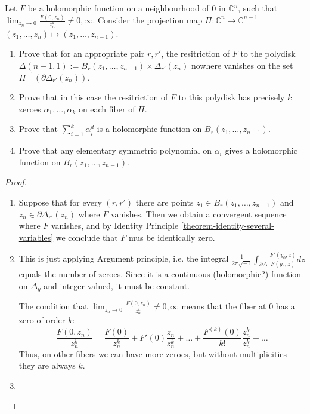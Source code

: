 \begin{exercise}
\label{exercise-polydisks}
Let $F$ be a holomorphic function on a
neighbourhood of $0$ in $\mathbb{C}^n$,
such that $\lim_{z_n\to 0}
\frac{F(0,z_n)}{z_n^k}\neq 0,\infty$.
Consider the projection map
$\Pi:\mathbb{C}^n\to\mathbb{C}^{n-1}$
$(z_1,\ldots,z_n)\mapsto
(z_1,\ldots,z_{n-1})$.
\begin{enumerate}
\item Prove that for an appropriate pair
$r,r'$, the resitriction of $F$ to the
polydisk
$\Delta(n-1,1):=B_r(z_1,\ldots,z_{n-1})
\times\Delta_{r'}(z_n)$
nowhere
vanishes on the set
$\Pi^{-1}(\partial\Delta_{r'}(z_n))$.
\item Prove that in this case the
resitriction of $F$ to this polydisk has
precisely $k$ zeroes
$\alpha_1,\ldots,\alpha_k$ on each fiber of
$\Pi$.
\item Prove that $\sum_{i=1}^k \alpha_i^d$ is
a holomorphic function on
$B_r(z_1,\ldots,z_{n-1})$.
\item Prove that any elementary symmetric
polynomial on $\alpha_i$ gives a
holomorphic function on
$B_r(z_1,\ldots,z_{n-1})$.
\end{enumerate}
\end{exercise}

\begin{proof}
\begin{enumerate}
\item Suppose that for every $(r,r')$ there
are points
$z_1\in B_r(z_1,\ldots,z_{n-1})$ and $z_n\in
\partial\Delta_{r'}(z_n)$
where $F$ vanishes. Then we obtain a
convergent sequence where $F$
vanishes, and by Identity Principle
\ref{theorem-identity-several-variables} we
conclude that $F$ mus be identically zero.
\item This is just applying Argument
principle, i.e. the integral
$\frac{1}{2\pi\sqrt{-1}}\int_{\partial
\Delta}\frac{F'(y_0,z)}{F(y_0,z)}dz$
equals the number of zeroes. Since it is a
continuous (holomorphic?) function on
$\Delta_y$ and integer valued, it must be
constant.

The condition that
$\lim_{z_n\to0}\frac{F(0,z_n)}{z_n^k}\neq
0,\infty$ means
that the fiber at 0 has a zero of order $k$:
$$
\frac{F(0,z_n)}{z_n^k}=\frac{F(0)}{z_n^k}+
F'(0)\frac{z_n}{z_n^k}+\ldots
+\frac{F^{(k)}(0)}{k!}\frac{z_n^k}{z_n^k}+
\ldots
$$
Thus, on other fibers we can have
more zeroes, but without multiplicities they
are always $k$.
\item
\end{enumerate}
\end{proof}

